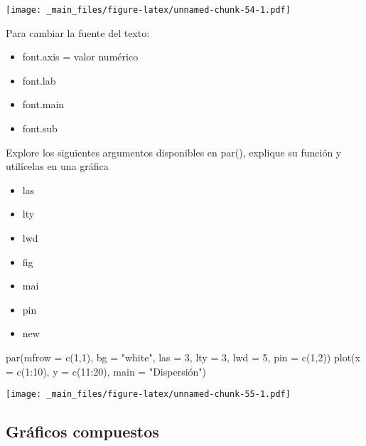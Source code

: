 \documentclass[
]{book}
\newenvironment{Shaded}{\begin{snugshade}}{\end{snugshade}}
\newcommand{\AttributeTok}[1]{\textcolor[rgb]{0.77,0.63,0.00}{#1}}
\newcommand{\DecValTok}[1]{\textcolor[rgb]{0.00,0.00,0.81}{#1}}
\newcommand{\FunctionTok}[1]{\textcolor[rgb]{0.00,0.00,0.00}{#1}}
\newcommand{\NormalTok}[1]{#1}
\newcommand{\SpecialCharTok}[1]{\textcolor[rgb]{0.00,0.00,0.00}{#1}}
\newcommand{\StringTok}[1]{\textcolor[rgb]{0.31,0.60,0.02}{#1}}
\providecommand{\tightlist}{%
  \setlength{\itemsep}{0pt}\setlength{\parskip}{0pt}}
\begin{document}
\texttt{[image: \_main\_files/figure-latex/unnamed-chunk-54-1.pdf]}

Para cambiar la fuente del texto:

\begin{itemize}
\tightlist
\item
  font.axis = valor numérico
\item
  font.lab
\item
  font.main
\item
  font.sub
\end{itemize}

Explore los siguientes argumentos disponibles en par(), explique su función y utilícelas en una gráfica

\begin{itemize}
\tightlist
\item
  las
\item
  lty
\item
  lwd
\item
  fig
\item
  mai
\item
  pin
\item
  new
\end{itemize}

\begin{Shaded}
\begin{Highlighting}[]
\FunctionTok{par}\NormalTok{(}\AttributeTok{mfrow =} \FunctionTok{c}\NormalTok{(}\DecValTok{1}\NormalTok{,}\DecValTok{1}\NormalTok{), }\AttributeTok{bg =} \StringTok{"white"}\NormalTok{, }\AttributeTok{las =} \DecValTok{3}\NormalTok{, }\AttributeTok{lty =} \DecValTok{3}\NormalTok{, }\AttributeTok{lwd =} \DecValTok{5}\NormalTok{, }\AttributeTok{pin =} \FunctionTok{c}\NormalTok{(}\DecValTok{1}\NormalTok{,}\DecValTok{2}\NormalTok{)) }
\FunctionTok{plot}\NormalTok{(}\AttributeTok{x =} \FunctionTok{c}\NormalTok{(}\DecValTok{1}\SpecialCharTok{:}\DecValTok{10}\NormalTok{), }\AttributeTok{y =} \FunctionTok{c}\NormalTok{(}\DecValTok{11}\SpecialCharTok{:}\DecValTok{20}\NormalTok{), }\AttributeTok{main =} \StringTok{"Dispersión"}\NormalTok{)}
\end{Highlighting}
\end{Shaded}

\texttt{[image: \_main\_files/figure-latex/unnamed-chunk-55-1.pdf]}

\hypertarget{gruxe1ficos-compuestos}{%
\subsection{Gráficos compuestos}\label{gruxe1ficos-compuestos}}
\end{document}
